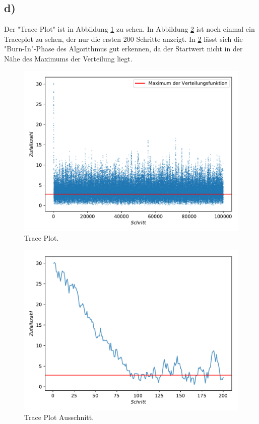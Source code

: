 \subsection{d)}
Der "Trace Plot" ist in Abbildung \ref{abb:2} zu sehen. In Abbildung \ref{abb:3} ist noch einmal ein Traceplot zu sehen,
der nur die ersten 200 Schritte anzeigt.
In  \ref{abb:3} lässt sich die "Burn-In"-Phase des Algorithmus gut erkennen, da der Startwert
nicht in der Nähe des Maximums der Verteilung liegt.
\begin{figure}[h]
  \centering
  \includegraphics{Aufgabe09/MetropolisSchritte.pdf}
  \caption{Trace Plot.}
  \label{abb:2}
\end{figure}
\begin{figure}[h]
  \centering
  \includegraphics{Aufgabe09/MetropolisSchritte2.pdf}
  \caption{Trace Plot Ausschnitt.}
  \label{abb:3}
\end{figure}
